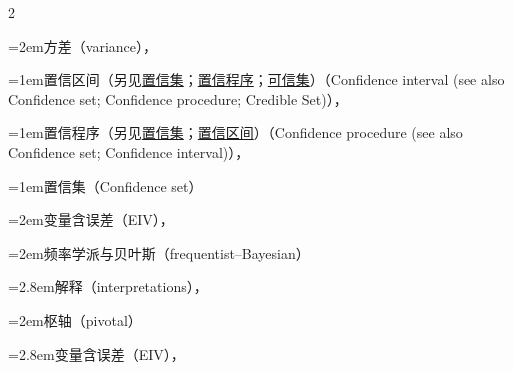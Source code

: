 \begin{multicols}{2}
\par\noindent\hangindent=2em\hspace*{1em}\label{idx:178}方差（variance），\hyperref[exercise:9.52]{\pageref*{exercise:9.52}}\par
\par\addvspace{2pt}
\par\noindent\hangindent=1em\hspace*{0em}\label{idx:179}置信区间（另见\hyperref[idx:181]{置信集}；\hyperref[idx:180]{置信程序}；\hyperref[idx:230]{可信集}）（Confidence interval (see also Confidence set; Confidence procedure; Credible Set)），\hyperref[def:9.1.1]{\pageref*{def:9.1.1}}\par
\par\addvspace{2pt}
\par\noindent\hangindent=1em\hspace*{0em}\label{idx:180}置信程序（另见\hyperref[idx:181]{置信集}；\hyperref[idx:129]{置信区间}）（Confidence procedure (see also Confidence set; Confidence interval)），\hyperref[sec:9.5.1]{\pageref*{sec:9.5.1}}\par
\par\addvspace{2pt}
\par\noindent\hangindent=1em\hspace*{0em}\label{idx:181}置信集（Confidence set）\par
\par\noindent\hangindent=2em\hspace*{1em}\label{idx:182}变量含误差（EIV），\hyperref[sec:12.2.4]{\pageref*{sec:12.2.4}}\par
{}
\par\noindent\hangindent=2em\hspace*{1em}\label{idx:183}频率学派与贝叶斯（frequentist–Bayesian）\par
\par\noindent\hangindent=2.8em\hspace*{1.8em}\label{idx:184}解释（interpretations），\hyperref[sec:9.2.4]{\pageref*{sec:9.2.4}}\par
{}
\par\noindent\hangindent=2em\hspace*{1em}\label{idx:185}枢轴（pivotal）\par
\par\noindent\hangindent=2.8em\hspace*{1.8em}\label{idx:186}变量含误差（EIV），\hyperref[eq:12.2.24]{\pageref*{eq:12.2.24}}\par

\end{multicols}
